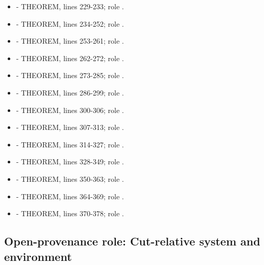 \begin{itemize}
\item
  \texttt{\protect{}} - THEOREM, lines 229-233; role
  \texttt{\protect{}}.
\item
  \texttt{\protect{}} - THEOREM, lines 234-252; role \texttt{\protect{}}.
\item
  \texttt{\protect{}} - THEOREM, lines 253-261; role
  \texttt{\protect{}}.
\item
  \texttt{\protect{}} - THEOREM, lines 262-272; role
  \texttt{\protect{}}.
\item
  \texttt{\protect{}} - THEOREM, lines 273-285; role
  \texttt{\protect{}}.
\item
  \texttt{\protect{}} - THEOREM, lines 286-299;
  role \texttt{\protect{}}.
\item
  \texttt{\protect{}} - THEOREM, lines 300-306; role
  \texttt{\protect{}}.
\item
  \texttt{\protect{}} - THEOREM, lines 307-313; role
  \texttt{\protect{}}.
\item
  \texttt{\protect{}} - THEOREM, lines 314-327; role
  \texttt{\protect{}}.
\item
  \texttt{\protect{}} - THEOREM, lines 328-349; role
  \texttt{\protect{}}.
\item
  \texttt{\protect{}} - THEOREM, lines 350-363; role
  \texttt{\protect{}}.
\item
  \texttt{\protect{}} - THEOREM, lines 364-369; role
  \texttt{\protect{}}.
\item
  \texttt{\protect{}} - THEOREM, lines 370-378; role
  \texttt{\protect{}}.
\end{itemize}

\subsection{Open-provenance role: Cut-relative system and
environment}\label{open-provenance-role-cut-relative-system-and-environment}


